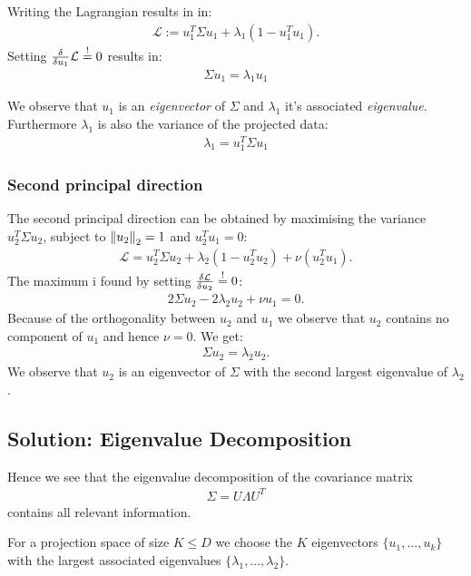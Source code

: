 Writing the Lagrangian results in in:
\begin{align*}
    \mathcal L:= u_1^T \Sigma u_1 + \lambda_1(1-u_1^Tu_1). 
\end{align*}
Setting ${\delta \over \delta u_1}\mathcal L \overset{!}{=} 0$ results in:
\begin{align*}
    \Sigma u_1 = \lambda_1 u_1
\end{align*}

We observe that $u_1$ is an \emph{eigenvector} of $\Sigma$ and $\lambda_1$ it's associated \emph{eigenvalue}. Furthermore $\lambda_1$ is also the variance of the projected data:
\begin{align*}
    \lambda_1 = u_1^T \Sigma u_1
\end{align*}
\subsubsection{Second principal direction}
The second principal direction can be obtained by maximising the variance $u_2^T \Sigma u_2$, subject to $\left\lVert u_2\right\rVert_2 = 1$ and $u_2^Tu_1 = 0$:
\begin{align*}
    \mathcal L = u_2^T \Sigma u_2 + \lambda_2\left( 1- u_2^Tu_2\right) +\nu \left(u_2^Tu_1\right).
\end{align*}
The maximum i found by setting ${\delta \mathcal L \over \delta u_2} \overset{!}{=} 0$:
\begin{align*}
    2\Sigma u_2 - 2\lambda_2 u_2+\nu u_1 = 0.
\end{align*}
Because of the orthogonality between $u_2$ and $u_1$ we observe that $u_2$ contains no component of $u_1$ and hence $\nu = 0$. We get:
\begin{align*}
    \Sigma u_2 = \lambda_2 u_2.
\end{align*}
We observe that $u_2$ is an eigenvector of $\Sigma$ with the second largest eigenvalue of $\lambda_2$.
\subsection{Solution: Eigenvalue Decomposition}
Hence we see that the eigenvalue decomposition of the covariance matrix
\begin{align*}
    \Sigma = U\Lambda U^T
\end{align*}
contains all relevant information. 

For a projection space of size $K\leq D$ we choose the $K$ eigenvectors $\{u_1,\ldots, u_k\}$ with the largest associated eigenvalues $\{\lambda_1, \ldots,\lambda_2\}$.

